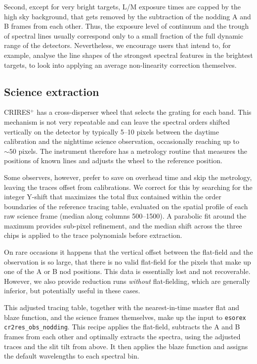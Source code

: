 \documentclass{aa}
\newcommand{\crires}{CRIRES$^+$}
\newcommand{\esorex}{\texttt{esorex}}
\begin{document}
Second, except for very bright targets, L/M exposure times are capped by the high sky background, that 
gets removed by the subtraction of the nodding A and B frames from each other.
Thus, the exposure level of continuum and the trough of spectral lines usually
correspond only to a small fraction of the full dynamic range of the detectors.
Nevertheless, we encourage users that intend to, for example, analyse the line shapes
of the strongest spectral features in the brightest targets, to look into
applying an average non-linearity correction themselves.

\subsection{Science extraction}
\label{sec:extraction}

\crires{} has a cross-disperser wheel that selects the grating for each band.
This mechanism is not very repeatable and can leave the spectral orders shifted
vertically on
the detector by typically 5--10 pixels between the daytime calibration
and the nighttime science observation, occasionally reaching up to
${\sim}50$ pixels. The instrument therefore has a metrology routine that 
measures the positions of known lines and adjusts the wheel to the 
reference position.

Some observers, however, prefer to save on overhead time and skip the metrology,
leaving the traces offset from calibrations.
We correct for this by searching for the integer Y-shift that
maximizes the total flux contained within the order boundaries of the
reference tracing table, evaluated on the spatial profile of each raw
science frame (median along columns 500--1500). A parabolic fit around
the maximum provides sub-pixel refinement, and the median shift across
the three chips is applied to the trace polynomials before extraction.

On rare occasions it happens that the vertical offset between the flat-field
and the observation is so large, that there is no valid flat-field for the pixels
that make up one of the A or B nod positions. This data is essentially lost
and not recoverable. However, we also provide reduction runs \emph{without}
flat-fielding, which are generally inferior, but potentially useful in these cases.

This adjusted tracing table, together with the nearest-in-time master flat
and blaze function, and the science frames themselves, make up the input to
\esorex{} \texttt{cr2res\_obs\_nodding}. This recipe applies the flat-field,
subtracts the A and B frames from each other and optimally extracts the spectra, using the adjusted
traces and the slit tilt from above.
It then applies the blaze function and assigns the default wavelengths to
each spectral bin.
\end{document}
